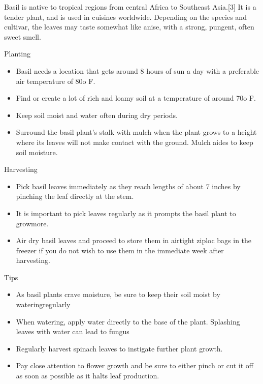 \documentclass[12pt, oneside, a4paper]{memoir}
\newenvironment{instruction}[1]
    {\begin{bclogo}[logo=\textcolor{ForestGreen}{\faTree}, noborder=true, couleurBarre=ForestGreen]{#1}
    }
    { 
       
    \end{bclogo}
    }
\newenvironment{instruction2}[1]
    {\begin{bclogo}[logo=\textcolor{YellowGreen}{\faTree}, noborder=true, couleurBarre=YellowGreen]{#1}
    }
    { 
    \end{bclogo}
    }
\newenvironment{tip}{
    \begin{bclogo}[logo=\bcinfo, couleurBarre=orange, noborder=true, couleur=white]{Tips}
}
{
    \end{bclogo}
}
\begin{document}
    \begin{definition}
     Basil is native to tropical regions from central Africa to Southeast Asia.[3] It is a tender plant, and is used in cuisines worldwide. Depending on the species and cultivar, the leaves may taste somewhat like anise, with a strong, pungent, often sweet smell.
    \end{definition}
   
    
    \begin{instruction}{Planting}
        \begin{itemize}
            \item Basil needs a location that gets around 8 hours of sun a day with a preferable air temperature of 80o F.
            \item Find or create a lot of rich and loamy soil at a temperature of around 70o
F.
            \item Keep soil moist and water often during dry periods.
            \item Surround the basil plant’s stalk with mulch when the plant grows to a height where its leaves will not make
contact with the ground. Mulch aides to keep soil moisture.
        \end{itemize}
    \end{instruction}

    
    \begin{instruction2}{Harvesting}
        \begin{itemize}
            \item Pick basil leaves immediately as they reach lengths of about 7 inches by pinching the leaf directly at the stem.
            \item It is important to pick leaves regularly as it prompts the basil plant to growmore.
            \item Air dry basil leaves and proceed to store them in airtight ziploc bags in the freezer if you do not wish to use them in the immediate week after harvesting.
        \end{itemize}
    \end{instruction2}

    \begin{tip}
        \begin{itemize}
            \item As basil plants crave moisture, be sure to keep their soil moist by wateringregularly
            \item When watering, apply water directly to the base of the plant. Splashing leaves with water can lead to fungus
            \item Regularly harvest spinach leaves to instigate further plant growth.
            \item Pay close attention to flower growth and be sure to either pinch or cut it off as soon as possible as it halts leaf production.
        \end{itemize}
    \end{tip}
\end{document}
